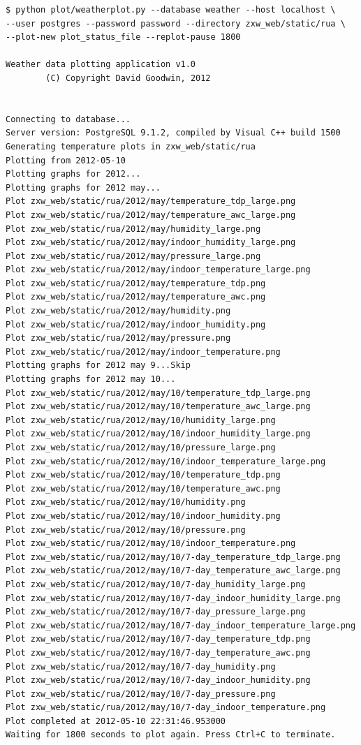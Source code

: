 \documentclass[a4paper,10pt,draft]{book}
\begin{document}
\begin{verbatim}
$ python plot/weatherplot.py --database weather --host localhost \
--user postgres --password password --directory zxw_web/static/rua \
--plot-new plot_status_file --replot-pause 1800

Weather data plotting application v1.0
        (C) Copyright David Goodwin, 2012


Connecting to database...
Server version: PostgreSQL 9.1.2, compiled by Visual C++ build 1500
Generating temperature plots in zxw_web/static/rua
Plotting from 2012-05-10
Plotting graphs for 2012...
Plotting graphs for 2012 may...
Plot zxw_web/static/rua/2012/may/temperature_tdp_large.png
Plot zxw_web/static/rua/2012/may/temperature_awc_large.png
Plot zxw_web/static/rua/2012/may/humidity_large.png
Plot zxw_web/static/rua/2012/may/indoor_humidity_large.png
Plot zxw_web/static/rua/2012/may/pressure_large.png
Plot zxw_web/static/rua/2012/may/indoor_temperature_large.png
Plot zxw_web/static/rua/2012/may/temperature_tdp.png
Plot zxw_web/static/rua/2012/may/temperature_awc.png
Plot zxw_web/static/rua/2012/may/humidity.png
Plot zxw_web/static/rua/2012/may/indoor_humidity.png
Plot zxw_web/static/rua/2012/may/pressure.png
Plot zxw_web/static/rua/2012/may/indoor_temperature.png
Plotting graphs for 2012 may 9...Skip
Plotting graphs for 2012 may 10...
Plot zxw_web/static/rua/2012/may/10/temperature_tdp_large.png
Plot zxw_web/static/rua/2012/may/10/temperature_awc_large.png
Plot zxw_web/static/rua/2012/may/10/humidity_large.png
Plot zxw_web/static/rua/2012/may/10/indoor_humidity_large.png
Plot zxw_web/static/rua/2012/may/10/pressure_large.png
Plot zxw_web/static/rua/2012/may/10/indoor_temperature_large.png
Plot zxw_web/static/rua/2012/may/10/temperature_tdp.png
Plot zxw_web/static/rua/2012/may/10/temperature_awc.png
Plot zxw_web/static/rua/2012/may/10/humidity.png
Plot zxw_web/static/rua/2012/may/10/indoor_humidity.png
Plot zxw_web/static/rua/2012/may/10/pressure.png
Plot zxw_web/static/rua/2012/may/10/indoor_temperature.png
Plot zxw_web/static/rua/2012/may/10/7-day_temperature_tdp_large.png
Plot zxw_web/static/rua/2012/may/10/7-day_temperature_awc_large.png
Plot zxw_web/static/rua/2012/may/10/7-day_humidity_large.png
Plot zxw_web/static/rua/2012/may/10/7-day_indoor_humidity_large.png
Plot zxw_web/static/rua/2012/may/10/7-day_pressure_large.png
Plot zxw_web/static/rua/2012/may/10/7-day_indoor_temperature_large.png
Plot zxw_web/static/rua/2012/may/10/7-day_temperature_tdp.png
Plot zxw_web/static/rua/2012/may/10/7-day_temperature_awc.png
Plot zxw_web/static/rua/2012/may/10/7-day_humidity.png
Plot zxw_web/static/rua/2012/may/10/7-day_indoor_humidity.png
Plot zxw_web/static/rua/2012/may/10/7-day_pressure.png
Plot zxw_web/static/rua/2012/may/10/7-day_indoor_temperature.png
Plot completed at 2012-05-10 22:31:46.953000
Waiting for 1800 seconds to plot again. Press Ctrl+C to terminate.
\end{verbatim}
\end{document}
